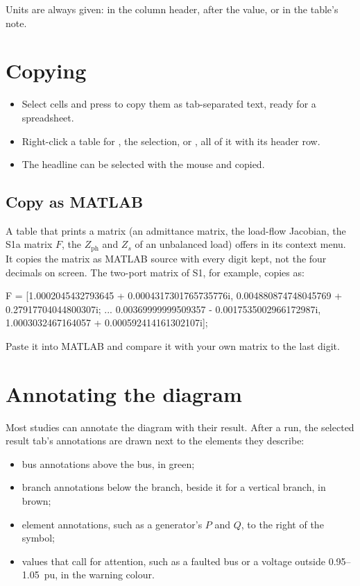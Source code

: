 Units are always given: in the column header, after the value, or in the table's note.

\section{Copying}

\begin{itemize}
  \item Select cells and press  to copy them as tab-separated text, ready
    for a spreadsheet.
  \item Right-click a table for , the selection, or , all of it
    with its header row.
  \item The headline can be selected with the mouse and copied.
\end{itemize}

\subsection{Copy as MATLAB}\label{sec:copy-matlab}

A table that prints a matrix (an admittance matrix, the load-flow Jacobian, the S1a
matrix $F$, the $Z_\text{ph}$ and $Z_s$ of an unbalanced load) offers  in its context menu. It copies the matrix as MATLAB source with every digit kept,
not the four decimals on screen. The two-port matrix of S1, for example, copies as:

\begin{terminal}
F = [1.0002045432793645 + 0.0004317301765735776i, 0.004880874748045769 + 0.27917704044800307i; ...
     0.00369999999509357 - 0.0017535002966172987i, 1.0003032467164057 + 0.000592414161302107i];
\end{terminal}

Paste it into MATLAB and compare it with your own matrix to the last digit.

\section{Annotating the diagram}\label{sec:annotations}

Most studies can annotate the diagram with their result. After a run, the selected result
tab's annotations are drawn next to the elements they describe:

\begin{itemize}
  \item bus annotations above the bus, in green;
  \item branch annotations below the branch, beside it for a vertical branch, in brown;
  \item element annotations, such as a generator's $P$ and $Q$, to the right of the
    symbol;
  \item values that call for attention, such as a faulted bus or a voltage outside
    0.95--1.05~pu, in the warning colour.
\end{itemize}


